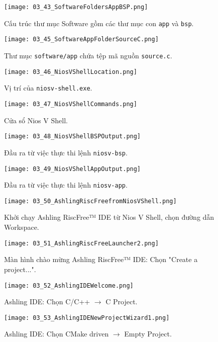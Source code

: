 \begin{figure}[htbp] \centering \texttt{[image: 03\_43\_SoftwareFoldersAppBSP.png]} \caption{Cấu trúc thư mục Software gồm các thư mục con \texttt{app} và \texttt{bsp}.} \label{fig:03_43} \end{figure}
\begin{figure}[htbp] \centering \texttt{[image: 03\_45\_SoftwareAppFolderSourceC.png]} \caption{Thư mục \texttt{software/app} chứa tệp mã nguồn \texttt{source.c}.} \label{fig:03_45} \end{figure}
\begin{figure}[htbp] \centering \texttt{[image: 03\_46\_NiosVShellLocation.png]} \caption{Vị trí của \texttt{niosv-shell.exe}.} \label{fig:03_46} \end{figure}
\begin{figure}[htbp] \centering \texttt{[image: 03\_47\_NiosVShellCommands.png]} \caption{Cửa sổ Nios V Shell.} \label{fig:03_47} \end{figure}
\begin{figure}[htbp] \centering \texttt{[image: 03\_48\_NiosVShellBSPOutput.png]} \caption{Đầu ra từ việc thực thi lệnh \texttt{niosv-bsp}.} \label{fig:03_48} \end{figure}\begin{figure}[htbp] \centering \texttt{[image: 03\_49\_NiosVShellAppOutput.png]} \caption{Đầu ra từ việc thực thi lệnh \texttt{niosv-app}.} \label{fig:03_49} \end{figure}
\begin{figure}[htbp] \centering \texttt{[image: 03\_50\_AshlingRiscFreefromNiosVShell.png]} \caption{Khởi chạy Ashling RiscFree™ IDE từ Nios V Shell, chọn đường dẫn Workspace.} \label{fig:03_50} \end{figure}
\begin{figure}[htbp] \centering \texttt{[image: 03\_51\_AshlingRiscFreeLauncher2.png]} \caption{Màn hình chào mừng Ashling RiscFree™ IDE: Chọn "Create a project...".} \label{fig:03_51} \end{figure}
\begin{figure}[htbp] \centering \texttt{[image: 03\_52\_AshlingIDEWelcome.png]} \caption{Ashling IDE: Chọn C/C++ $\longrightarrow$ C Project.} \label{fig:03_52} \end{figure}
\begin{figure}[htbp] \centering \texttt{[image: 03\_53\_AshlingIDENewProjectWizard1.png]} \caption{Ashling IDE: Chọn CMake driven $\longrightarrow$ Empty Project.} \label{fig:03_53} \end{figure}
